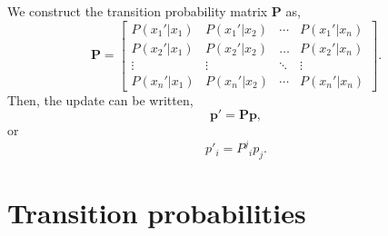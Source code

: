 \documentclass{article}
\numberwithin{equation}{section}
\begin{document}
We construct the transition probability matrix $\mathbf{P}$ as,
\begin{equation}
\mathbf{P} = \begin{bmatrix}
P(x_1'|x_1) & P(x_1'|x_2) & \cdots & P(x_1'|x_n)\\
P(x_2'|x_1) & P(x_2'|x_2) & \dots & P(x_2'|x_n)\\
\vdots & \vdots & \ddots & \vdots\\
P(x_n'|x_1) & P(x_n'|x_2) & \cdots & P(x_n'|x_n)
\end{bmatrix}.
\end{equation}
Then, the update can be written,
\begin{equation}
\mathbf{p}' = \mathbf{P}\mathbf{p},
\end{equation}
or
\begin{equation}
p'_i = {P^j}_ip_j.
\end{equation}


\section{Transition probabilities}
\end{document}
